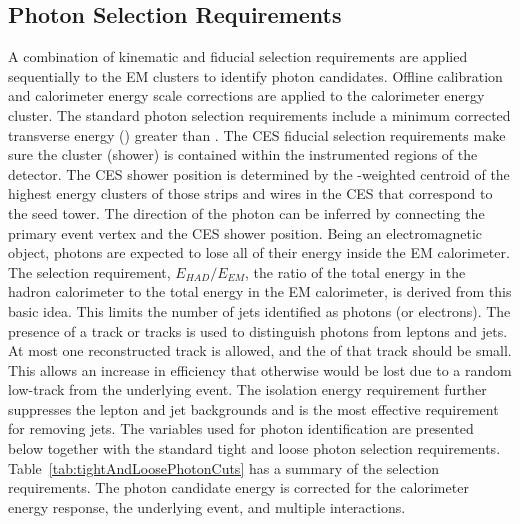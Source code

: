 \subsection{Photon Selection Requirements}
A combination of kinematic and fiducial selection requirements are applied sequentially to the EM clusters to identify photon candidates. Offline calibration and calorimeter energy scale corrections are applied to the calorimeter energy cluster. The standard photon selection requirements include a minimum corrected transverse energy (\etcorr) greater than . The CES fiducial selection requirements make sure the cluster (shower) is contained within the instrumented regions of the detector. The CES shower position is determined by the \et-weighted centroid of the highest energy clusters of those strips and wires in the CES that correspond to the seed tower. The direction of the photon can be inferred by connecting the primary event vertex and the CES shower position. Being an electromagnetic object, photons are expected to lose all of their energy inside the EM calorimeter. The selection requirement, $E_{HAD}/E_{EM}$, the ratio of the total energy in the hadron calorimeter to the total energy in the EM calorimeter, is derived from this basic idea. This limits the number of jets identified as photons (or electrons). The presence of a track or tracks is used to distinguish photons from leptons and jets. At most one reconstructed track is allowed, and the \pt of that track should be small. This allows an increase in efficiency that otherwise would be lost due to a random low-\pt track from the underlying event. The isolation energy requirement further suppresses the lepton and jet backgrounds and is the most effective requirement for removing jets.
The variables used for photon identification are presented below together with the standard tight and loose photon selection requirements. Table~\ref{tab:tightAndLoosePhotonCuts} has a summary of the selection requirements. The photon candidate energy is corrected for the calorimeter energy response, the underlying event, and multiple interactions.

